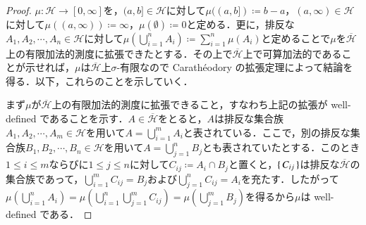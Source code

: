 \begin{proof}
$\mu \colon \mathcal{H} \to [0,\infty]$を，$(a,b] \in \mathcal{H}$に対して$\mu((a,b]) \coloneqq b-a$，$(a,\infty) \in \mathcal{H}$に対して$\mu((a,\infty)) \coloneqq \infty$，$\mu(\emptyset) \coloneqq 0$と定める．更に，排反な$A_1, A_2, \cdots, A_n \in \mathcal{H}$に対して$\mu\left(\bigcup_{i=1}^n A_i\right) \coloneqq \sum_{i=1}^n \mu(A_i)$と定めることで$\mu$を$\overline{\mathcal{H}}$上の有限加法的測度に拡張できたとする．その上で$\overline{\mathcal{H}}$上で可算加法的であることが示せれば，$\mu$は$\overline{\mathcal{H}}$上$\sigma$-有限なので Carath\'eodory の拡張定理によって結論を得る．以下，これらのことを示していく．

まず$\mu$が$\overline{\mathcal{H}}$上の有限加法的測度に拡張できること，すなわち上記の拡張が well-defined であることを示す．$A \in \overline{\mathcal{H}}$をとると，$A$は排反な集合族$A_1, A_2, \cdots, A_m \in \mathcal{H}$を用いて$A = \bigcup_{i=1}^m A_i$と表されている．ここで，別の排反な集合族$B_1, B_2, \cdots, B_n \in \mathcal{H}$を用いて$A = \bigcup_{j=1}^n B_j$とも表されていたとする．このとき$1 \leq i \leq m$ならびに$1 \leq j \leq n$に対して$C_{ij} \coloneqq A_i \cap B_j$と置くと，$\set{C_{ij}}$は排反な$\overline{\mathcal{H}}$の集合族であって，$\bigcup_{i=1}^m C_{ij} = B_j$および$\bigcup_{j=1}^n C_{ij} = A_i$を充たす．したがって$\mu\left( \bigcup_{i=1}^n A_i \right) = \mu\left( \bigcup_{i=1}^n \bigcup_{j=1}^m C_{ij} \right) = \mu\left( \bigcup_{j=1}^m B_j \right)$を得るから$\mu$は well-defined である．


\end{proof}
